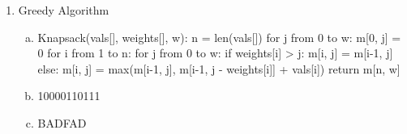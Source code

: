 \documentclass[12pt]{article}
\newcommand\tab[1][1cm]{\hspace*{#1}}
\begin{document}
\begin {enumerate}
\begin {enumerate}[(a)]
	\end {enumerate}
\item Greedy Algorithm
	\begin {enumerate}[(a)]
		\item
			Knapsack(vals[], weights[], w):
\tab				n = len(vals[])
\tab				for j from 0 to w:
\tab\tab			m[0, j] = 0
\tab				for i from 1 to n:
\tab\tab 			for j from 0 to w:
\tab\tab\tab 		if weights[i] > j:
\tab\tab\tab\tab	m[i, j] = m[i-1, j]
\tab\tab\tab 		else:
\tab\tab\tab\tab	m[i, j] = max(m[i-1, j], m[i-1, j - weights[i]] + vals[i])
\tab				return m[n, w]
		\item
			10000110111
		\item
			BADFAD
	\end {enumerate}
\end {enumerate}
\end{document}
